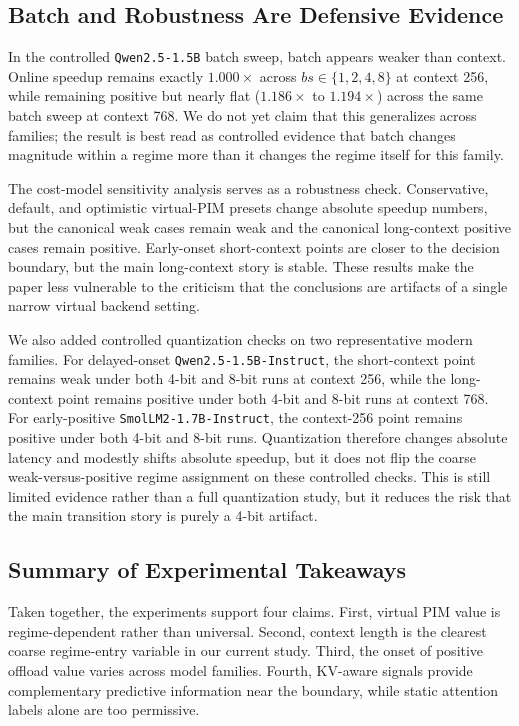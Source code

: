 \subsection{Batch and Robustness Are Defensive Evidence}

In the controlled \texttt{Qwen2.5-1.5B} batch sweep, batch appears weaker than context. Online speedup remains exactly $1.000\times$ across $bs \in \{1,2,4,8\}$ at context 256, while remaining positive but nearly flat ($1.186\times$ to $1.194\times$) across the same batch sweep at context 768. We do not yet claim that this generalizes across families; the result is best read as controlled evidence that batch changes magnitude within a regime more than it changes the regime itself for this family.

The cost-model sensitivity analysis serves as a robustness check. Conservative, default, and optimistic virtual-PIM presets change absolute speedup numbers, but the canonical weak cases remain weak and the canonical long-context positive cases remain positive. Early-onset short-context points are closer to the decision boundary, but the main long-context story is stable. These results make the paper less vulnerable to the criticism that the conclusions are artifacts of a single narrow virtual backend setting.



We also added controlled quantization checks on two representative modern families. For delayed-onset \texttt{Qwen2.5-1.5B-Instruct}, the short-context point remains weak under both 4-bit and 8-bit runs at context 256, while the long-context point remains positive under both 4-bit and 8-bit runs at context 768. For early-positive \texttt{SmolLM2-1.7B-Instruct}, the context-256 point remains positive under both 4-bit and 8-bit runs. Quantization therefore changes absolute latency and modestly shifts absolute speedup, but it does not flip the coarse weak-versus-positive regime assignment on these controlled checks. This is still limited evidence rather than a full quantization study, but it reduces the risk that the main transition story is purely a 4-bit artifact.

\subsection{Summary of Experimental Takeaways}

Taken together, the experiments support four claims. First, virtual PIM value is regime-dependent rather than universal. Second, context length is the clearest coarse regime-entry variable in our current study. Third, the onset of positive offload value varies across model families. Fourth, KV-aware signals provide complementary predictive information near the boundary, while static attention labels alone are too permissive.
